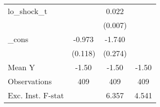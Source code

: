 {\begin{tabular}{l*{3}{c}}
\addlinespace
lo\_shock\_t  &                     &       0.022\sym{***}&                     \\
            &                     &     (0.007)         &                     \\
\addlinespace
\_cons      &      -0.973\sym{***}&      -1.740\sym{***}&                     \\
            &     (0.118)         &     (0.274)         &                     \\
\midrule
Mean Y      &       -1.50         &       -1.50         &       -1.50         \\
Observations&         409         &         409         &         409         \\
Exc. Inst. F-stat&                     &       6.357         &       4.541         \\
\bottomrule
\end{tabular}
}
